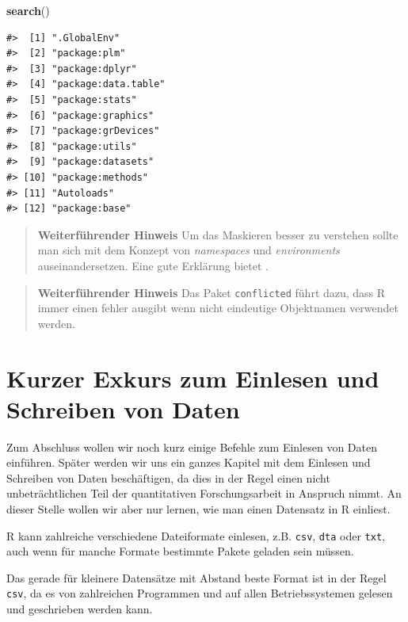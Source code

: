 \documentclass[]{tufte-book}
\newenvironment{Shaded}{}{}
\newcommand{\KeywordTok}[1]{\textcolor[rgb]{0.00,0.44,0.13}{\textbf{#1}}}
\newcommand{\NormalTok}[1]{#1}
\begin{document}
\begin{Shaded}
\begin{Highlighting}[]
\KeywordTok{search}\NormalTok{()}
\end{Highlighting}
\end{Shaded}

\begin{verbatim}
#>  [1] ".GlobalEnv"        
#>  [2] "package:plm"       
#>  [3] "package:dplyr"     
#>  [4] "package:data.table"
#>  [5] "package:stats"     
#>  [6] "package:graphics"  
#>  [7] "package:grDevices" 
#>  [8] "package:utils"     
#>  [9] "package:datasets"  
#> [10] "package:methods"   
#> [11] "Autoloads"         
#> [12] "package:base"
\end{verbatim}

\begin{quote}
\textbf{Weiterführender Hinweis} Um das Maskieren besser zu verstehen
sollte man sich mit dem Konzept von \emph{namespaces} und
\emph{environments} auseinandersetzen. Eine gute Erklärung bietet
\citet{Packages}.
\end{quote}

\begin{quote}
\textbf{Weiterführender Hinweis} Das Paket \texttt{conflicted} führt
dazu, dass R immer einen fehler ausgibt wenn nicht eindeutige
Objektnamen verwendet werden.
\end{quote}

\section{Kurzer Exkurs zum Einlesen und Schreiben von
Daten}\label{kurzer-exkurs-zum-einlesen-und-schreiben-von-daten}

Zum Abschluss wollen wir noch kurz einige Befehle zum Einlesen von Daten
einführen. Später werden wir uns ein ganzes Kapitel mit dem Einlesen und
Schreiben von Daten beschäftigen, da dies in der Regel einen nicht
unbeträchtlichen Teil der quantitativen Forschungsarbeit in Anspruch
nimmt. An dieser Stelle wollen wir aber nur lernen, wie man einen
Datensatz in R einliest.

R kann zahlreiche verschiedene Dateiformate einlesen, z.B. \texttt{csv},
\texttt{dta} oder \texttt{txt}, auch wenn für manche Formate bestimmte
Pakete geladen sein müssen.

Das gerade für kleinere Datensätze mit Abstand beste Format ist in der
Regel \texttt{csv}, da es von zahlreichen Programmen und auf allen
Betriebssystemen gelesen und geschrieben werden kann.
\end{document}
